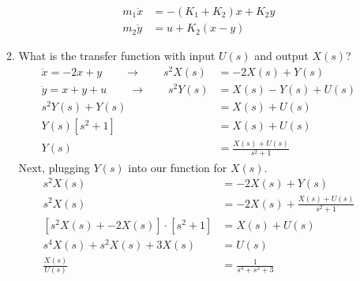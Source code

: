 \documentclass[11pt]{article}
\begin{document}
\begin{enumerate}
\begin{enumerate}
\begin{center}
        \end{center}
        \begin{align*}
            m_1\ddot{x}&=-(K_1+K_2)x+K_2y\\
            m_2\ddot{y}&=u+K_2(x-y)
        \end{align*}
        \item What is the transfer function with input \(U(s)\) and output \(X(s)\)?
        \begin{align*}
            \ddot{x}=-2x+y\qquad\rightarrow\qquad s^2X(s)&=-2X(s)+Y(s)\\
            \ddot{y}=x+y+u\qquad\rightarrow\qquad s^2Y(s)&=X(s)-Y(s)+U(s)\\
            s^2Y(s)+Y(s)&=X(s)+U(s)\\
            Y(s)\left[s^2+1\right]&=X(s)+U(s)\\
            Y(s)&=\frac{X(s)+U(s)}{s^2+1}
        \end{align*}
        Next, plugging \(Y(s)\) into our function for \(X(s)\).
        \begin{align*}
            s^2X(s)&=-2X(s)+Y(s)\\
            s^2X(s)&=-2X(s)+\frac{X(s)+U(s)}{s^2+1}\\
            \left[s^2X(s)+-2X(s)\right]\cdot\left[s^2+1\right]&=X(s)+U(s)\\
            s^4X(s)+s^2X(s)+3X(s)&=U(s)\\
            \frac{X(s)}{U(s)}&=\frac{1}{s^4+s^2+3}
        \end{align*}


\end{enumerate}
\end{enumerate}
\end{document}
